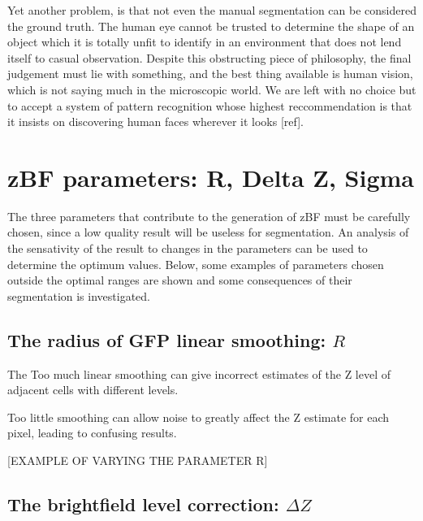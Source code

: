 Yet another problem, is that not even the manual segmentation can be considered the ground truth. The human eye cannot be trusted to determine the shape of an object which it is totally unfit to identify in an environment that does not lend itself to casual observation. Despite this obstructing piece of philosophy, the final judgement must lie with something, and the best thing available is human vision, which is not saying much in the microscopic world. We are left with no choice but to accept a system of pattern recognition whose highest reccommendation is that it insists on discovering human faces wherever it looks [ref].

\section{zBF parameters: R, Delta Z, Sigma}

The three parameters that contribute to the generation of zBF must be carefully chosen, since a low quality result will be useless for segmentation. An analysis of the sensativity of the result to changes in the parameters can be used to determine the optimum values. Below, some examples of parameters chosen outside the optimal ranges are shown and some consequences of their segmentation is investigated.

\subsection{The radius of GFP linear smoothing: $R$}



The Too much linear smoothing can give incorrect estimates of the Z level of adjacent cells with different levels.

Too little smoothing can allow noise to greatly affect the Z estimate for each pixel, leading to confusing results.

[EXAMPLE OF VARYING THE PARAMETER R]

\subsection{The brightfield level correction: $\Delta Z$}

